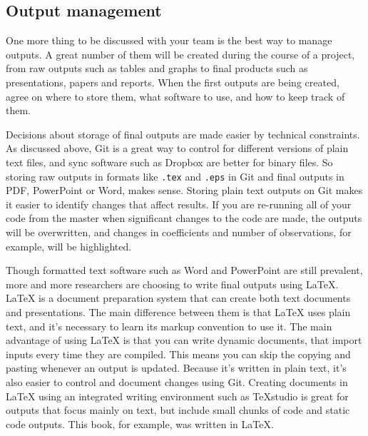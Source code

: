 \subsection{Output management}

One more thing to be discussed with your team is the best way to manage outputs.
A great number of them will be created during the course of a project,
from raw outputs such as tables and graphs to final products such as presentations, papers and reports.
When the first outputs are being created, agree on where to store them,
what software to use, and how to keep track of them.

Decisions about storage of final outputs are made easier by technical constraints.
As discussed above, Git is a great way to control for different versions of
plain text files, and sync software such as Dropbox are better for binary files.
So storing raw outputs in formats like \texttt{.tex} and \texttt{.eps} in Git and
final outputs in PDF, PowerPoint or Word, makes sense.
Storing plain text outputs on Git makes it easier to identify changes that affect results.
If you are re-running all of your code from the master when significant changes to the code are made,
the outputs will be overwritten, and changes in coefficients and number of observations, for example,
will be highlighted.

Though formatted text software such as Word and PowerPoint are still prevalent,
more and more researchers are choosing to write final outputs using
\LaTeX.
{\LaTeX} is a document preparation system that can create both text documents and presentations.
The main difference between them is that {\LaTeX} uses plain text,
and it's necessary to learn its markup convention to use it.
The main advantage of using {\LaTeX} is that you can write dynamic documents,
that import inputs every time they are compiled.
This means you can skip the copying and pasting whenever an output is updated.
Because it's written in plain text, it's also easier to control and document changes using Git.
Creating documents in {\LaTeX} using an integrated writing environment such as TeXstudio
is great for outputs that focus mainly on text,
but include small chunks of code and static code outputs.
This book, for example, was written in \LaTeX.

